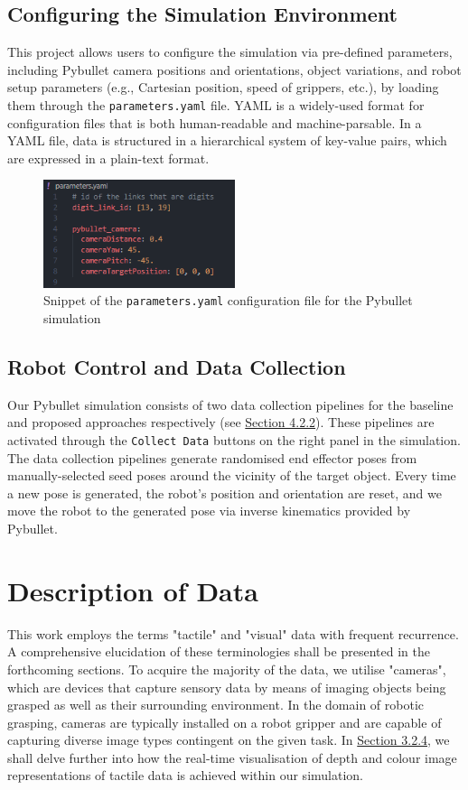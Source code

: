 \documentclass[11pt, a4paper]{report}
\begin{document}
\subsection{Configuring the Simulation Environment}\label{sec:3.1.2}
This project allows users to configure the simulation via pre-defined parameters, including Pybullet camera positions and orientations, object variations, and robot setup parameters (e.g., Cartesian position, speed of grippers, etc.), by loading them through the \verb|parameters.yaml| file. YAML is a widely-used format for configuration files that is both human-readable and machine-parsable. In a YAML file, data is structured in a hierarchical system of key-value pairs, which are expressed in a plain-text format.
\begin{figure}[H]
    \centering
    \includegraphics[width=0.5\textwidth]{docs/Project Report/Media/3_1_2_yaml.png}
    \caption{Snippet of the {\verb|parameters.yaml|} configuration file for the Pybullet simulation}
    \label{fig:3.3}
\end{figure}


\subsection{Robot Control and Data Collection}\label{sec:3.1.3}
Our Pybullet simulation consists of two data collection pipelines for the baseline and proposed approaches respectively (see \hyperref[sec:4.2.2]{Section 4.2.2}). These pipelines are activated through the \verb|Collect Data| buttons on the right panel in the simulation. The data collection pipelines generate randomised end effector poses from manually-selected seed poses around the vicinity of the target object. Every time a new pose is generated, the robot's position and orientation are reset, and we move the robot to the generated pose via inverse kinematics provided by Pybullet.



\section{Description of Data}\label{sec:3.2}
This work employs the terms "tactile" and "visual" data with frequent recurrence. A comprehensive elucidation of these terminologies shall be presented in the forthcoming sections. To acquire the majority of the data, we utilise "cameras", which are devices that capture sensory data by means of imaging objects being grasped as well as their surrounding environment. In the domain of robotic grasping, cameras are typically installed on a robot gripper and are capable of capturing diverse image types contingent on the given task. In \hyperref[sec:3.2.4]{Section 3.2.4}, we shall delve further into how the real-time visualisation of depth and colour image representations of tactile data is achieved within our simulation.
\end{document}
